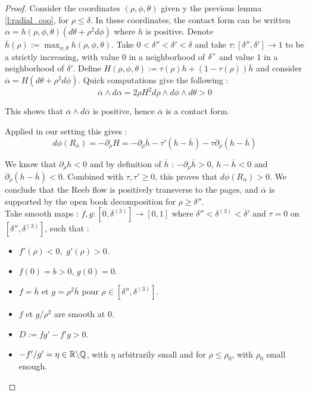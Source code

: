 \documentclass[../main.tex]{subfiles}
\begin{document}
\begin{proof}
Consider the coordinates $(\rho,\phi,\theta)$ given y the previous lemma \ref{l:radial_coo}, for $\rho\leq \delta$. In these coordinates, the contact form can be written $\alpha = h(\rho,\phi,\theta)(d\theta + \rho^2d\phi)$ where $h$ is positive. Denote $\overline{h}(\rho) := \displaystyle\max_{\phi,\theta}h(\rho,\phi,\theta)$. Take $0 < \delta''<\delta'<\delta$ and take $\tau : [\delta'',\delta']\rightarrow 1$ to be a strictly increasing, with value $0$ in a neighborhood of $\delta"$ and value $1$ in a neighborhood of $\delta'$. Define $H(\rho,\phi,\theta) := \tau(\rho)h + (1-\tau(\rho))\overline{h}$ and consider $\overline{\alpha} =H(d\theta + \rho^2d\phi)$. Quick computations give the following : 
$$\overline{\alpha}\wedge d\overline{\alpha} = 2\rho H^2d\rho\wedge d\phi\wedge d\theta >0$$

 This shows that $\overline{\alpha}\wedge d\overline{\alpha}$ is positive, hence $\overline{\alpha}$ is a contact form. 
 
Applied in our setting this gives :  
$$d\phi(R_{\overline{\alpha}}) = - \partial_\rho H = - \partial_\rho \overline{h} - \tau '(h-\overline{h} ) - \tau \partial_\rho(h-\overline{h})$$

We know that $\partial_\rho h < 0$ and by definition of $\overline{h}$ : $-\partial_\rho \overline{h}> 0$, $h-\overline{h}< 0$ and $\partial_\rho(h-\overline{h}) < 0$. Combined with $\tau,\tau' \geq 0$, this proves that $d\phi(R_{\overline{\alpha}})> 0$. We conclude that the Reeb flow is positively transverse to the pages, and $\overline{\alpha}$ is supported by the open book decomposition for $\rho \geq \delta''$.\\

Take smooth maps : $f,g : [0,\delta^{(3)}]\rightarrow [0,1]$ where $\delta'' <\delta ^{(3)} < \delta '$ and $\tau = 0$ on $[\delta'',\delta^{(3)}]$, such that :
\begin{itemize}
    \item $f'(\rho) < 0,\,\,g'(\rho)> 0$.
    \item $f(0) = b> 0$, $g(0) = 0$.
    \item $f = \overline{h}$ et $g = \rho^2\overline{h}$ pour $\rho \in [\delta'',\delta ^{(3)}]$.
    \item $f$ et $g/\rho^2$ are smooth at $0$.
    \item $D := fg' - f'g > 0$.
    \item $-f'/g' = \eta \in\mathbb{R}\backslash\mathbb{Q} $, with $\eta$ arbitrarily small and for $\rho \leq \rho_0$, with $\rho_0$ small enough.
\end{itemize}


\end{proof}
\end{document}
